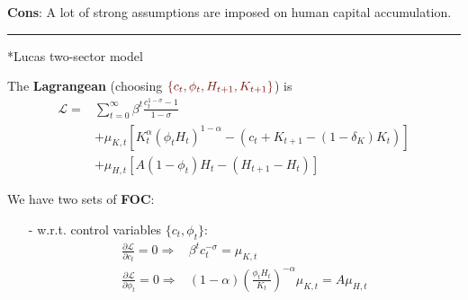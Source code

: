 \documentclass[10pt,landscape,a4paper]{article}
\makeatletter
\renewcommand{\subsection}{\@startsection{subsection}{1}{0mm}{.2ex}{.2ex}{\small\bfseries}}
\makeatother
\begin{document}
\begin{multicols*}{3}
\textbf{Cons}: A lot of strong assumptions are imposed on human capital accumulation.

\rule{0.325\textwidth}{0.4pt}

\subsection*{Lucas two-sector model}
\vspace{2pt}

\vspace{2pt}
The \textbf{Lagrangean} (choosing ${\color{myred}\left\{c_t,\phi_t,H_{t+1},K_{t+1}\right\}}$) is
\begin{align*}
    \mathcal{L} = &\sum^{\infty}_{t=0}\beta^t\frac{c_t^{1-\sigma}-1}{1-\sigma} \\
    &+\mu_{K,t}\left[ K_t^{\alpha}\left(\phi_t H_t \right)^{1-\alpha}-\left(c_t+K_{t+1}-\left(1-\delta_K\right)K_t\right) \right]\\
    & + \mu_{H,t}\left[A\left(1-\phi_t\right)H_t-\left(H_{t+1}-H_t\right) \right]
\end{align*}

We have two sets of \textbf{FOC}:

\begin{itemize}
    \item[-] w.r.t. control variables $\{c_t,\phi_t\}$:
    \begin{align*}
        \frac{\partial \mathcal{L}}{\partial c_t}=0 \Rightarrow & \beta^t c_t^{-\sigma}=\mu_{K,t}\\
        \frac{\partial \mathcal{L}}{\partial \phi_t}=0 \Rightarrow& (1-\alpha)\left(\frac{\phi_t H_t}{K_t}\right)^{-\alpha}\mu_{K,t}=A\mu_{H,t}
    \end{align*}
    

\end{itemize}
\end{multicols*}
\end{document}
